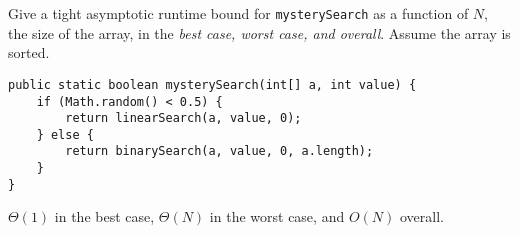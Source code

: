 \begin{blocksection}
\question Give a tight asymptotic runtime bound for \lstinline$mysterySearch$
as a function of $N$, the size of the array, in the \emph{best case, worst
case, and overall}. Assume the array is sorted.

\begin{lstlisting}
public static boolean mysterySearch(int[] a, int value) {
    if (Math.random() < 0.5) {
        return linearSearch(a, value, 0);
    } else {
        return binarySearch(a, value, 0, a.length);
    }
}
\end{lstlisting}

\begin{solution}[0.5in]
$\Theta(1)$ in the best case, $\Theta(N)$ in the worst case, and $O(N)$ overall.
\end{solution}
\end{blocksection}
